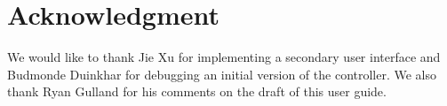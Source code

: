 \clearpage
\section{Acknowledgment}
We would like to thank Jie Xu for implementing a secondary user interface and Budmonde Duinkhar for debugging an initial version of the controller. We also thank Ryan Gulland for his comments on the draft of this user guide.